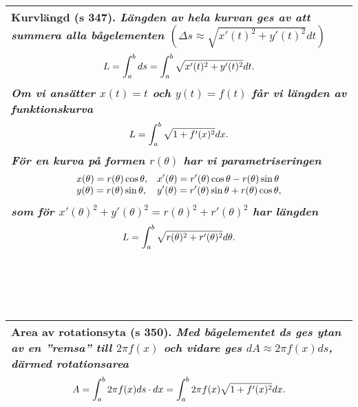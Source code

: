 \documentclass[a4paper]{article}
\begin{document}
\begin{tabular}{|L{11.5cm}|} \hline
\textbf{Kurvlängd} (s 347). 
\textit{Längden av hela kurvan ges av att summera alla \textbf{bågelementen} $(\Delta s \approx \sqrt{x'(t)^2+y'(t)^2}dt)$}
\begin{equation*}
\begin{array}{>{\displaystyle}c}
L = \int_a^b ds = \int_{a}^{b}\sqrt{x'(t)^2+y'(t)^2}dt.
\end{array}
\end{equation*}
\textit{Om vi ansätter $x(t)=t$ och $y(t)=f(t)$ får vi längden av funktionskurva}
\begin{equation*}
\begin{array}{>{\displaystyle}c}
L = \int_{a}^{b}\sqrt{1+f'(x)^2}dx.
\end{array}
\end{equation*}
\textit{För en kurva på formen $r(\theta)$ har vi parametriseringen}
\begin{equation*}
\begin{array}{>{\displaystyle}l>{\displaystyle}l}
x(\theta)=r(\theta)\cos \theta , & x'(\theta)=r'(\theta)\cos \theta - r(\theta)\sin \theta\\
y(\theta)=r(\theta)\sin \theta , & y'(\theta)=r'(\theta)\sin \theta
+r(\theta)\cos \theta ,
\end{array}
\end{equation*}
\textit{som för $x'(\theta)^2+y'(\theta)^2=r(\theta)^2+r'(\theta)^2$ har längden}
\begin{equation*}
\begin{array}{>{\displaystyle}c}
L = \int_{a}^{b}\sqrt{r(\theta)^2+r'(\theta)^2}d\theta.
\end{array}
\end{equation*}
\\\hline
\end{tabular}
\\\\\\
\begin{tabular}{|L{11.5cm}|} \hline
\textbf{Area av rotationsyta} (s 350).
\textit{Med bågelementet ds ges ytan av en ''remsa'' till $2\pi f(x)$ och vidare ges $dA\approx 2\pi f(x) ds$, därmed \textbf{rotationsarea}}
\begin{equation*}
\begin{array}{>{\displaystyle}c}
A = \int_{a}^{b}2\pi f(x)ds\cdot dx=\int_{a}^{b}2\pi f(x)\sqrt{1+f'(x)^2}dx.
\end{array}
\end{equation*}
\\\hline
\end{tabular}
\end{document}
